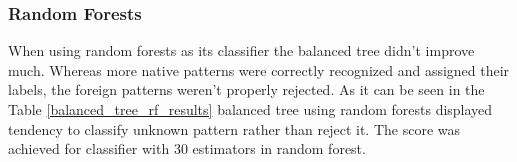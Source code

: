 \subsubsection{Random Forests}

When using random forests as its classifier the balanced tree didn't improve much. Whereas more native patterns were correctly recognized and assigned their labels, the foreign patterns weren't properly rejected. As it can be seen in the Table \ref{balanced_tree_rf_results} balanced tree using random forests displayed tendency to classify unknown pattern rather than reject it. The score was achieved for classifier with 30 estimators in random forest.

\begin{table}[htp]
	\centering
	\caption{Results for Balanced tree using Random Forests classifier with n\_estimators=30}
	\label{balanced_tree_rf_results}
\end{table}
